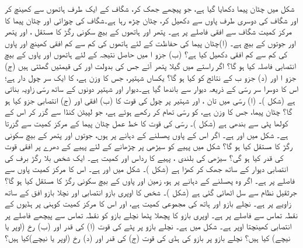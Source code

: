 شکل  میں چٹان پیما   دکھایا گیا ہے، جو  پیچھے جھک  کر،    شگاف کے ایک طرف ہاتھوں سے کھینچ کر اور  شگاف کی دوسری طرف پاوں سے دکھیل کر،  چٹان چڑھ رہا ہے۔شگاف کی چوڑائی    اور چٹان پیما کا مرکز کمیت  شگاف سے  افقی فاصلے پر ہے۔ پتھر اور ہاتھوں کے بیچ سکونی رگڑ کا مستقل ، اور  پتھر اور جوتوں کے بیچ  ہے۔ (ا)چٹان پیما کی حفاظت    کے لئے  ہاتھوں کی کم سے کم افقی  کھینچ اور  پاوں کی کم سے کم  افقی دکھیل  کیا ہے؟ (ب) جزو ا میں حاصل  نتیجہ کے لئے ہاتھوں اور پاوں کے بیچ  انتصابی فاصلہ  کیا ہو گا؟ اگر راستے میں گیلا پتھر  آئے جس کی بدولت  اور  کی قیمتیں گھٹتی ہیں (ج) جزو ا اور (د) جزو ب کے نتائج کو کیا ہو گا؟
یکساں شہتیر، جس کا وزن  ہے، کا ایک سر چول دار ہے؛ اس کا دوسرا سر رسّی  کے ذریعہ  دیوار سے باندھا گیا ہے۔دیوار اور شہتیر دونوں کے ساتھ  رسّی زاویہ  بناتی ہے (شکل )۔ (ا) رسّی میں تان ، اور  شہتیر  پر   چول کی قوت کا (ب) افقی اور (ج) انتصابی جزو  کیا ہو گا؟
چٹان پیما، جس کا وزن  ہے، کو  رسّی  تھام کر رکھے ہوئے ہے، جو لپیٹن کنڈا سے گزر کر  اس کے کولھا پٹی سے بندھی ہے (شکل )۔ رسّی  کی قوت کا خط عمل چٹان پیما کے مرکز کمیت سے گزرتا ہے۔ شکل میں  اور  ہے۔ اگر اس کے پاوں پھسلنے  کے دہانے پر  ہوں، جوتوں اور  پتھر  کے بیچ سکونی رگڑ کا مستقل کیا ہو گا؟
شکل  میں پہیے کو سیڑھی پر چڑھانے کے لئے پہیے کے  دھرے پر  افقی قوت  کی قدر  کیا ہو گی؟ سیڑھی کی بلندی
  ،  پہیے کا رداس   اور کمیت  ہے۔
ایک شخص بلا رگڑ   برف کی انتصابی دیوار کے ساتھ   جھک کر کھڑا ہے (شکل )۔ شکل میں  اور 
 ہے۔ اس کا مرکز کمیت  پاوں سے  فاصلے پر ہے۔ اگر وہ پھسلنے کے دہانے پر ہو، زمین اور پاوں کے بیچ سکونی رگڑ کا مستقل کیا ہو گا؟
جرثقیل نظام سے   سل اٹھائی گئی ہے (شکل )۔ شخص کا اوپری بازو انتصابی  اور نچلا بازو  افق کے ساتھ  زاویے پر ہے۔ نچلے بازو اور ہاتھ کی  مجموعی  کمیت  ہے، اور اس کا مرکز کمیت کوہنی  پر ہڈیوں کے نقطہ تماس سے  فاصلے پر ہے۔ اوپری بازو کا  پچھلا پٹھا  نچلے بازو کو  نقطہ تماس سے  پیچھے  فاصلے پر انتصابی کھینچتا اوپر  ہے۔ شکل میں  ہے۔   نچلے بازو پر  پٹے کی قوت (ا)  کی قدر اور (ب) رخ (اوپر یا نیچے)  کیا ہیں؟ نچلے بازو پر بازو کی ہڈی  کی قوت (ج) کی قدر اور (د) رخ  (اوپر یا نیچے)کیا ہیں؟
